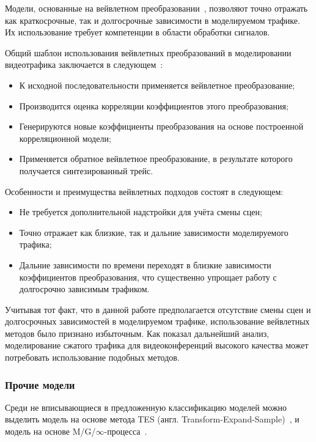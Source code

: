 Модели, основанные на вейвлетном преобразовании~\cite{salomoncomp},
позволяют точно отражать как краткосрочные, так и долгосрочные зависимости
в моделируемом трафике. Их использование требует компетенции в области
обработки сигналов.

Общий шаблон использования вейвлетных преобразований в моделировании
видеотрафика заключается в следующем~\cite{survey2013, wavelet}:

\begin{itemize}
    \item К исходной последовательности применяется вейвлетное преобразование;
    \item Производится оценка корреляции коэффициентов этого преобразования;
    \item Генерируются новые коэффициенты преобразования на основе построенной корреляционной модели;
    \item Применяется обратное вейвлетное преобразование, в результате которого получается синтезированный трейс.
\end{itemize}
\hspace{2pt}

Особенности и преимущества вейвлетных подходов состоят в следующем:
\begin{itemize}
    \item Не требуется дополнительной надстройки для учёта смены сцен;
    \item Точно отражает как близкие, так и дальние зависимости моделируемого трафика;
    \item Дальние зависимости по времени переходят в близкие
        зависимости коэффициентов преобразования, что существенно
        упрощает работу с долгосрочно зависимым трафиком.
\end{itemize}
\hspace{2pt}

Учитывая тот факт, что в данной работе предполагается отсутствие
смены сцен и долгосрочных зависимостей в моделируемом трафике,
использование вейвлетных методов было признано избыточным.
Как показал дальнейший анализ, моделирование сжатого трафика
для видеоконференций высокого качества может потребовать использование
подобных методов.

\subsubsection{Прочие модели}
\hspace{3pt}

Среди не вписывающиеся в предложенную классификацию моделей
можно выделить модель на основе метода TES (англ. Transform-Expand-Sample)~\cite{tesmodel},
и модель на основе M/G/$\infty$-процесса~\cite{mginfty}.

